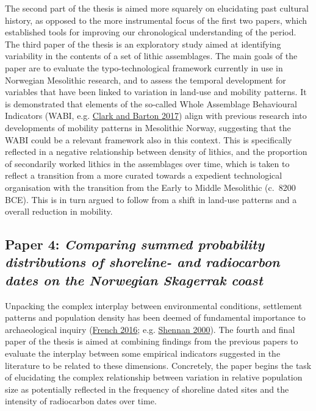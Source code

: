 \documentclass[
  12pt,
  a4paper,
  oneside]{book}
\begin{document}
The second part of the thesis is aimed more squarely on elucidating past cultural history, as opposed to the more instrumental focus of the first two papers, which established tools for improving our chronological understanding of the period. The third paper of the thesis is an exploratory study aimed at identifying variability in the contents of a set of lithic assemblages. The main goals of the paper are to evaluate the typo-technological framework currently in use in Norwegian Mesolithic research, and to assess the temporal development for variables that have been linked to variation in land-use and mobility patterns. It is demonstrated that elements of the so-called Whole Assemblage Behavioural Indicators (WABI, e.g. \protect\hyperlink{ref-clark2017}{Clark and Barton 2017}) align with previous research into developments of mobility patterns in Mesolithic Norway, suggesting that the WABI could be a relevant framework also in this context. This is specifically reflected in a negative relationship between density of lithics, and the proportion of secondarily worked lithics in the assemblages over time, which is taken to reflect a transition from a more curated towards a expedient technological organisation with the transition from the Early to Middle Mesolithic (c.~8200 BCE). This is in turn argued to follow from a shift in land-use patterns and a overall reduction in mobility.

\hypertarget{paper-4-comparing-summed-probability-distributions-of-shoreline--and-radiocarbon-dates-on-the-norwegian-skagerrak-coast}{%
\subsection{\texorpdfstring{Paper 4: \emph{Comparing summed probability distributions of shoreline- and radiocarbon dates on the Norwegian Skagerrak coast}}{Paper 4: Comparing summed probability distributions of shoreline- and radiocarbon dates on the Norwegian Skagerrak coast}}\label{paper-4-comparing-summed-probability-distributions-of-shoreline--and-radiocarbon-dates-on-the-norwegian-skagerrak-coast}}

Unpacking the complex interplay between environmental conditions, settlement patterns and population density has been deemed of fundamental importance to archaeological inquiry (\protect\hyperlink{ref-french2016}{French 2016}; e.g. \protect\hyperlink{ref-shennan2000}{Shennan 2000}). The fourth and final paper of the thesis is aimed at combining findings from the previous papers to evaluate the interplay between some empirical indicators suggested in the literature to be related to these dimensions. Concretely, the paper begins the task of elucidating the complex relationship between variation in relative population size as potentially reflected in the frequency of shoreline dated sites and the intensity of radiocarbon dates over time.
\end{document}
